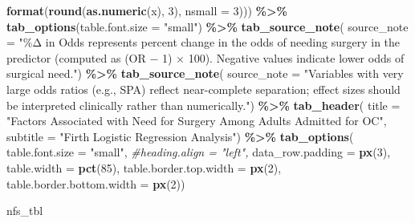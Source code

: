 \documentclass[
]{article}
\newenvironment{Shaded}{\begin{snugshade}}{\end{snugshade}}
\newcommand{\AttributeTok}[1]{\textcolor[rgb]{0.13,0.29,0.53}{#1}}
\newcommand{\CommentTok}[1]{\textcolor[rgb]{0.56,0.35,0.01}{\textit{#1}}}
\newcommand{\DecValTok}[1]{\textcolor[rgb]{0.00,0.00,0.81}{#1}}
\newcommand{\FunctionTok}[1]{\textcolor[rgb]{0.13,0.29,0.53}{\textbf{#1}}}
\newcommand{\NormalTok}[1]{#1}
\newcommand{\SpecialCharTok}[1]{\textcolor[rgb]{0.81,0.36,0.00}{\textbf{#1}}}
\newcommand{\StringTok}[1]{\textcolor[rgb]{0.31,0.60,0.02}{#1}}
\begin{document}
\begin{Shaded}
\begin{Highlighting}[]
                            \FunctionTok{format}\NormalTok{(}\FunctionTok{round}\NormalTok{(}\FunctionTok{as.numeric}\NormalTok{(x), }\DecValTok{3}\NormalTok{), }\AttributeTok{nsmall =} \DecValTok{3}\NormalTok{))) }\SpecialCharTok{\%\textgreater{}\%}
  \FunctionTok{tab\_options}\NormalTok{(}\AttributeTok{table.font.size =} \StringTok{"small"}\NormalTok{) }\SpecialCharTok{\%\textgreater{}\%}
  \FunctionTok{tab\_source\_note}\NormalTok{(}
    \AttributeTok{source\_note =} \StringTok{"\%Δ in Odds represents percent change in the odds of needing surgery}
\StringTok{    in the predictor (computed as (OR − 1) × 100). Negative values indicate lower}
\StringTok{    odds of surgical need."}\NormalTok{) }\SpecialCharTok{\%\textgreater{}\%} 
  \FunctionTok{tab\_source\_note}\NormalTok{(}
    \AttributeTok{source\_note =} \StringTok{"Variables with very large odds ratios (e.g., SPA) reflect}
\StringTok{    near{-}complete separation; effect sizes should be interpreted clinically }
\StringTok{    rather than numerically."}\NormalTok{) }\SpecialCharTok{\%\textgreater{}\%} 
    \FunctionTok{tab\_header}\NormalTok{(}
    \AttributeTok{title =} \StringTok{"Factors Associated with Need for Surgery Among Adults Admitted for OC"}\NormalTok{,}
    \AttributeTok{subtitle =} \StringTok{"Firth Logistic Regression Analysis"}\NormalTok{) }\SpecialCharTok{\%\textgreater{}\%} 
  \FunctionTok{tab\_options}\NormalTok{(}
    \AttributeTok{table.font.size =} \StringTok{"small"}\NormalTok{,}
    \CommentTok{\#heading.align = "left",}
    \AttributeTok{data\_row.padding =} \FunctionTok{px}\NormalTok{(}\DecValTok{3}\NormalTok{),}
    \AttributeTok{table.width =} \FunctionTok{pct}\NormalTok{(}\DecValTok{85}\NormalTok{),}
    \AttributeTok{table.border.top.width =} \FunctionTok{px}\NormalTok{(}\DecValTok{2}\NormalTok{),}
    \AttributeTok{table.border.bottom.width =} \FunctionTok{px}\NormalTok{(}\DecValTok{2}\NormalTok{))}

\NormalTok{nfs\_tbl}
\end{Highlighting}
\end{Shaded}
\end{document}
